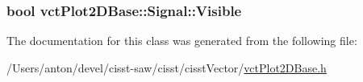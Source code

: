 \subsubsection[{Visible}]{\setlength{\rightskip}{0pt plus 5cm}bool vct\+Plot2\+D\+Base\+::\+Signal\+::\+Visible\hspace{0.3cm}{\ttfamily [protected]}}\label{classvct_plot2_d_base_1_1_signal_a7b4f18f8aef3c6353c64d86274c397bd}


The documentation for this class was generated from the following file\+:\begin{DoxyCompactItemize}
\item 
/\+Users/anton/devel/cisst-\/saw/cisst/cisst\+Vector/\hyperlink{vct_plot2_d_base_8h}{vct\+Plot2\+D\+Base.\+h}\end{DoxyCompactItemize}
